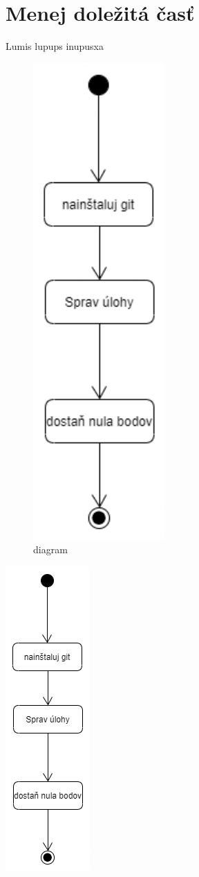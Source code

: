 \documentclass[10pt,twoside,slovak,a4paperr]{coursepaper}
\begin{document}
\section{Menej doležitá časť} \label{ina}
Lumis lupups inupusxa

\begin{figure}[!]
\centering
\includegraphics[scale =0.5]{first.pdf}
\caption{diagram}
\label{f:rozhod}
\end{figure}

\includegraphics[scale =0.5, angle=90]{first.png}
\centering
\end{document}
